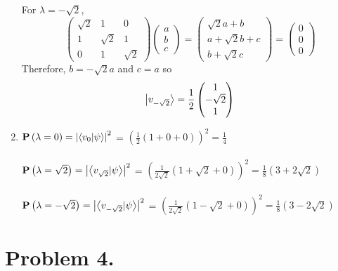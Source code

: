 \documentclass[12pt]{extarticle}
\begin{document}
\begin{enumerate}
For $\lambda = -\sqrt{2}$, 
\[
  \begin{pmatrix}
    \sqrt{2} & 1 & 0 \\
    1 & \sqrt{2} & 1 \\
    0 & 1 & \sqrt{2}
  \end{pmatrix}
  \begin{pmatrix}
	a \\
	b \\
	c
  \end{pmatrix}
  = 
  \begin{pmatrix}
	\sqrt{2} a + b \\
	a + \sqrt{2} b + c \\
	b + \sqrt{2} c
  \end{pmatrix}
  =
  \begin{pmatrix}
	0 \\
	0 \\
	0
  \end{pmatrix}
\] 
Therefore, $b = -\sqrt{2} a$ and $c = a$ so 
\[ \left| v_{-\sqrt{2}} \right> = \frac{1}{2} 
  \begin{pmatrix}
	1 \\
	-\sqrt{2} \\
	1
  \end{pmatrix}
\]
\newpage
\item $\mathbf{P}\left(\lambda = 0 \right) = \left| \left< v_0 | \psi \right> \right|^2$ = $\left( \frac{1}{2}(1 + 0 + 0)  \right)^2 = 
\frac{1}{4}$ \\ \\
$\mathbf{P}\left(\lambda = \sqrt{2} \right) = \left|\left< v_{\sqrt{2}} | \psi \right> \right|^2$ = $\left( \frac{1}{2\sqrt{2}}(1 + \sqrt{2} + 0)  \right)^2 = \frac{1}{8} (3 + 2\sqrt{2})$ \\ \\
$\mathbf{P}\left(\lambda = -\sqrt{2} \right) = \left| \left< v_{-\sqrt{2}} | \psi \right> \right|^2$ = $\left( \frac{1}{2\sqrt{2}}(1 - \sqrt{2} + 0)  \right)^2 = \frac{1}{8} (3 - 2\sqrt{2})$ 

\end{enumerate}

\section*{Problem 4.}
\end{document}
